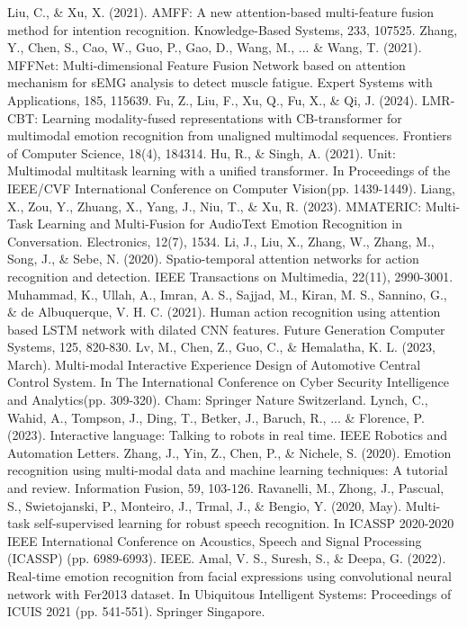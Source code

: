 \documentclass[preprint,12pt]{elsarticle}
\begin{document}
\begin{thebibliography}{99}
 Liu, C., \& Xu, X. (2021). AMFF: A new attention-based multi-feature fusion method for intention recognition. Knowledge-Based Systems, 233, 107525.
 Zhang, Y., Chen, S., Cao, W., Guo, P., Gao, D., Wang, M., ... \& Wang, T. (2021). MFFNet: Multi-dimensional Feature Fusion Network based on attention mechanism for sEMG analysis to detect muscle fatigue. Expert Systems with Applications, 185, 115639.
 Fu, Z., Liu, F., Xu, Q., Fu, X., \& Qi, J. (2024). LMR-CBT: Learning modality-fused representations with CB-transformer for multimodal emotion recognition from unaligned multimodal sequences. Frontiers of Computer Science, 18(4), 184314.
 Hu, R., \& Singh, A. (2021). Unit: Multimodal multitask learning with a unified transformer. In Proceedings of the IEEE/CVF International Conference on Computer Vision(pp. 1439-1449).
 Liang, X., Zou, Y., Zhuang, X., Yang, J., Niu, T., \& Xu, R. (2023). MMATERIC: Multi-Task Learning and Multi-Fusion for AudioText Emotion Recognition in Conversation. Electronics, 12(7), 1534.
 Li, J., Liu, X., Zhang, W., Zhang, M., Song, J., \& Sebe, N. (2020). Spatio-temporal attention networks for action recognition and detection. IEEE Transactions on Multimedia, 22(11), 2990-3001.
 Muhammad, K., Ullah, A., Imran, A. S., Sajjad, M., Kiran, M. S., Sannino, G., \& de Albuquerque, V. H. C. (2021). Human action recognition using attention based LSTM network with dilated CNN features. Future Generation Computer Systems, 125, 820-830.
 Lv, M., Chen, Z., Guo, C., \& Hemalatha, K. L. (2023, March). Multi-modal Interactive Experience Design of Automotive Central Control System. In The International Conference on Cyber Security Intelligence and Analytics(pp. 309-320). Cham: Springer Nature Switzerland.
 Lynch, C., Wahid, A., Tompson, J., Ding, T., Betker, J., Baruch, R., ... \& Florence, P. (2023). Interactive language: Talking to robots in real time. IEEE Robotics and Automation Letters.
 Zhang, J., Yin, Z., Chen, P., \& Nichele, S. (2020). Emotion recognition using multi-modal data and machine learning techniques: A tutorial and review. Information Fusion, 59, 103-126.
 Ravanelli, M., Zhong, J., Pascual, S., Swietojanski, P., Monteiro, J., Trmal, J., \& Bengio, Y. (2020, May). Multi-task self-supervised learning for robust speech recognition. In ICASSP 2020-2020 IEEE International Conference on Acoustics, Speech and Signal Processing (ICASSP) (pp. 6989-6993). IEEE.
 Amal, V. S., Suresh, S., \& Deepa, G. (2022). Real-time emotion recognition from facial expressions using convolutional neural network with Fer2013 dataset. In Ubiquitous Intelligent Systems: Proceedings of ICUIS 2021 (pp. 541-551). Springer Singapore.

\end{thebibliography}
\end{document}
